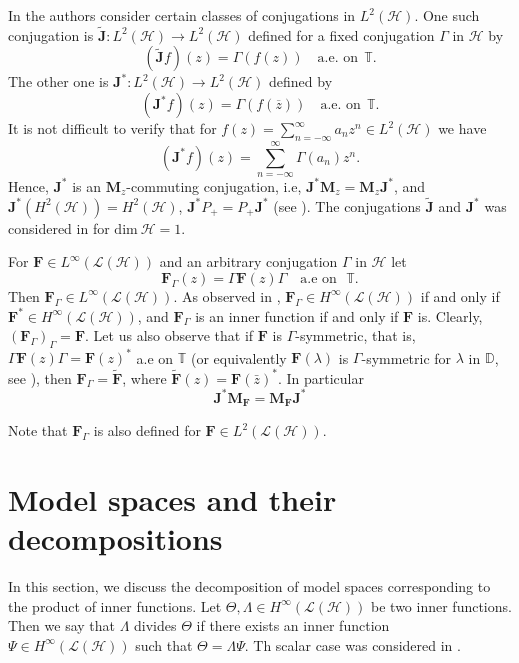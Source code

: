 \documentclass[12pt]{amsart}
\numberwithin{equation}{section}
\newcommand{\hsp}{\mathcal{H}}
\newcommand{\oL }{\mathcal{L}(\hsp) }
\newcommand{\M}{{\mathbf{M}}}
\newcommand{\F}{{\mathbf{F}}}
\newcommand{\J}{{\mathbf{J}}}
\theoremstyle{definition}
\numberwithin{equation}{section}
\begin{document}
In \cite{CKLP} the authors consider certain classes of conjugations in $L^2(\hsp)$. One such conjugation is $\widetilde{\J}:L^2(\hsp)\to L^2(\hsp)$ defined for a fixed conjugation $\Gamma$ in $\hsp$ by
\begin{equation}\label{J1}
(\widetilde{\J}f)(z)=\Gamma(f(z))\quad \text{a.e. on}~~\mathbb{T}.
\end{equation}
 The other one
 is $\J^*:L^2(\hsp)\to L^2(\hsp)$ defined by
\begin{equation}\label{J}
(\J^*f)(z)=\Gamma(f(\overline{z}))\quad \text{a.e. on}~~\mathbb{T}.
\end{equation}
It is not difficult to verify that for $f(z)=\sum_{n=-\infty}^{\infty}a_nz^n\in L^{2}(\hsp)$ we have
$$(\J^*f)(z)=\sum_{n=-\infty}^{\infty}\Gamma(a_n)z^n.$$
Hence, $\J^*$ is an $\M_z$-commuting conjugation, i.e, $\J^*\M_z=\M_z\J^*$, and $\J^*(H^{2}(\hsp))=H^{2}(\hsp)$, $\J^*P_+=P_+\J^*$ (see \cite[Section 4]{CKLP}). The conjugations $\widetilde{\J}$ and $\J^*$  was considered in \cite{AP} for $\text{dim}~ \hsp=1$.

For $\F\in L^\infty(\oL)$ and an arbitrary conjugation $\Gamma$ in $\hsp$ let
\begin{equation}\label{F}
\F_\Gamma(z)=\Gamma\F(z)\Gamma\quad \text{a.e on}~~~ \mathbb{T}.
\end{equation}
Then $\F_\Gamma\in L^\infty(\oL)$. As observed in \cite{CKLP}, $\F_\Gamma\in H^\infty(\oL)$ if and only if $\F^*\in H^\infty(\oL)$, and $\F_\Gamma$ is an inner function if and only if $\F$ is. Clearly, $(\F_\Gamma)_\Gamma=\F.$ Let us also observe that if $\F$ is $\Gamma$-symmetric, that is, $\Gamma\F(z)\Gamma=\F(z)^*$ a.e on $\mathbb{T}$ (or equivalently $\F(\lambda)$ is $\Gamma$-symmetric for $\lambda$ in $\mathbb{D}$, see \cite{CKLP}), then $\F_\Gamma=\widetilde{\F}$, where $\widetilde{\F}(z)=\F(\bar z)^{*}$.
 In particular
\begin{equation}\label{JM}
\J^*\M_\F=\M_\F\J^*
\end{equation}


Note that $\F_\Gamma$ is also defined for $\F\in L^{2}(\oL)$.





\section{\bf{Model spaces and their decompositions}}
In this section, we discuss the decomposition of model spaces corresponding to the product of inner functions.
Let $\Theta, \Lambda\in H^{\infty}(\oL)$ be two inner functions. Then we say that $\Lambda$ divides $\Theta$ if there exists an inner function $\Psi\in H^{\infty}(\oL)$ such that $\Theta=\Lambda\Psi$. Th scalar case was considered in \cite{CKP}.
\end{document}
